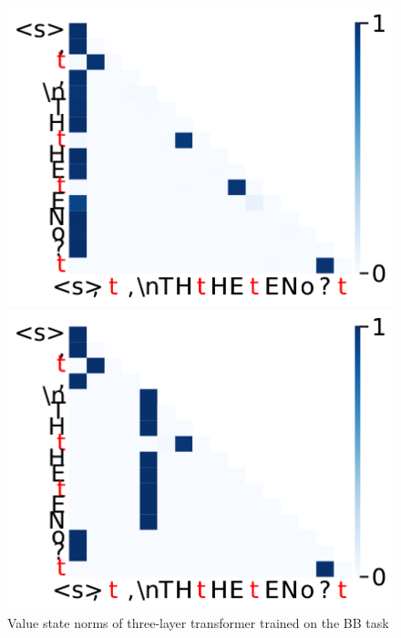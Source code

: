 \begin{figure}[t]
\begin{minipage}{0.3\textwidth}
      \includegraphics[width=\linewidth]{Figures/BBM_appendix/massive_attn_fig1.pdf}
  \end{minipage}
  \begin{minipage}{0.3\textwidth}
      \centering
      \vspace{-.2em}
      \includegraphics[width=\linewidth]{Figures/BBM_appendix/massive_attn_fig2.pdf}
  \end{minipage}
  \caption{\small Value state norms of three-layer transformer trained on the BB task}
  \label{appfigure:massive-attn}
  \vspace{-1em}
\end{figure}

